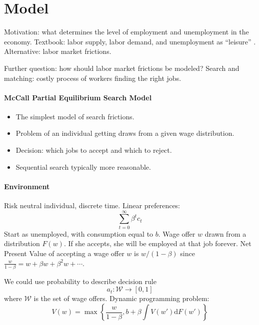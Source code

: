 \documentclass[11pt,a4paper]{article}
\begin{document}
\section{Model}\label{sec:model}
Motivation: what determines the level of employment and unemployment in the economy. 
Textbook: labor supply, labor demand, and unemployment as ``leisure'' .
Alternative: labor market frictions. 

Further question: how should labor market frictions be modeled?
Search and matching: costly process of workers finding the right jobs.

\paragraph{McCall Partial Equilibrium Search Model}
\begin{itemize}
    \item The simplest model of search frictions.
    \item Problem of an individual getting draws from a given wage distribution.
    \item Decision: which jobs to accept and which to reject. 
    \item Sequential search typically more reasonable.
\end{itemize}
\paragraph{Environment}
Risk neutral individual, discrete time. Linear preferences: $$ \sum_{t=0}^\infty \beta^t c_t $$
Start as unemployed, with consumption equal to $b$. Wage offer $w$ drawn from a distribution $F(w)$. If she accepts, she will be employed at that job forever. Net Present Value of accepting a wage offer $w$ is $w/(1-\beta)$ since $\frac{w}{1-\beta} = w + \beta w +\beta^2 w + \cdots$.

We could use probability to describe decision rule $$ a_t : \mathcal{W}\to [0,1] $$ where $\mathcal{W}$ is the set of wage offers.
Dynamic programming problem: $$ V(w) = \max \left\{ \frac{w}{1-\beta}, b + \beta \int V(w') \mathrm{d}F(w') \right\} $$ 
\end{document}
